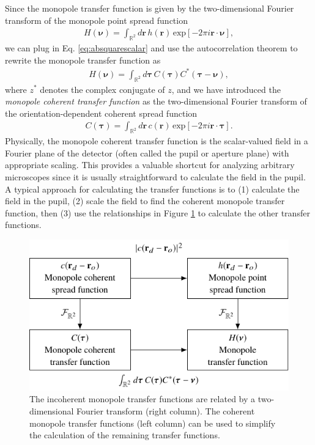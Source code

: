 \documentclass[]{osa-article}
\providecommand{\mb}[1]{\mathbf{#1}}
\providecommand{\mbb}[1]{\mathbb{#1}}
\providecommand{\bs}[1]{\boldsymbol{#1}}
\begin{document}
Since the monopole transfer function is given by the two-dimensional Fourier
transform of the monopole point spread function
\begin{align}
  H(\bs{\nu}) = \int_{\mbb{R}^2}d\mb{r}\,h(\mb{r})\,\text{exp}[-2\pi i\mb{r}\cdot\bs{\nu}],
\end{align}
we can plug in Eq. \ref{eq:absquarescalar} and use the autocorrelation theorem to
rewrite the monopole transfer function as
\begin{align}
  H(\bs{\nu}) = \int_{\mbb{R}^2}d\bs{\tau}\, C(\bs{\tau})C^*(\bs{\tau} - \bs{\nu}), 
\end{align}
where $z^*$ denotes the complex conjugate of $z$, and we have introduced the
\textit{monopole coherent transfer function} as the two-dimensional Fourier
transform of the orientation-dependent coherent spread function
\begin{align}
  C(\bs{\tau}) = \int_{\mbb{R}^2}d\mb{r}\, c(\mb{r})\,\text{exp}[-2\pi i\mb{r}\cdot\bs{\tau}].
\end{align}
Physically, the monopole coherent transfer function is the scalar-valued field
in a Fourier plane of the detector (often called the pupil or aperture plane)
with appropriate scaling. This provides a valuable shortcut for analyzing
arbitrary microscopes since it is usually straightforward to calculate the field
in the pupil. A typical approach for calculating the transfer functions is to
(1) calculate the field in the pupil, (2) scale the field to find the coherent
monopole transfer function, then (3) use the relationships in Figure
\ref{fig:monopole-transfer-functions} to calculate the other transfer functions.

\begin{figure}
  \centering
  \includegraphics[scale=1.0]{../figures/monopole-transfer-functions/monopole-transfer-functions.pdf}
  \caption{The incoherent monopole transfer functions are related by a
    two-dimensional Fourier transform (right column). The coherent monopole
    transfer functions (left column) can be used to simplify the calculation of
    the remaining transfer functions.}
   \label{fig:monopole-transfer-functions}
 \end{figure}
\end{document}

